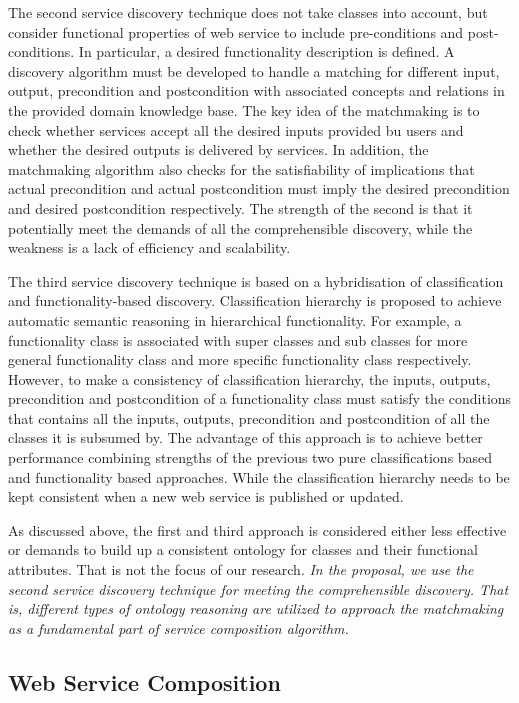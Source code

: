 The second service discovery technique  does not take classes into account, but consider functional properties of web service to include pre-conditions and post-conditions. In particular, a desired functionality description is defined. A discovery algorithm must be developed to handle a matching for different input, output, precondition and postcondition with associated concepts and relations in the provided domain knowledge base. The key idea of the matchmaking is to check whether services accept all the desired inputs provided bu users and whether the desired outputs is delivered by services. In addition, the matchmaking algorithm also checks for the satisfiability of implications that actual precondition and actual postcondition must imply the desired precondition and desired postcondition respectively. The strength of the second is that it potentially meet the demands of all the comprehensible discovery, while the weakness is a lack of efficiency and scalability. 

The third service discovery technique is based on a hybridisation of classification and functionality-based discovery. Classification hierarchy is proposed to achieve automatic semantic reasoning in hierarchical functionality. For example, a functionality class is associated with super classes and sub classes for more general functionality class and more specific functionality class respectively. However, to make a consistency of classification hierarchy, the inputs, outputs, precondition and postcondition of a functionality class must satisfy the conditions that contains all the inputs, outputs, precondition and postcondition of all the classes it is subsumed by. The advantage of this approach is to achieve better performance combining strengths of the previous two pure classifications based and functionality based approaches. While the classification hierarchy needs to be kept consistent when a new web service is published or updated.​

As discussed above, the first and third approach is considered either less effective or demands to build up a consistent ontology for classes and their functional attributes. That is not the focus of our research.  \emph{In the proposal, we use the second service discovery technique for meeting the comprehensible discovery. That is, different types of ontology reasoning are utilized to approach the matchmaking as a fundamental part of service composition algorithm.}



\subsection{Web Service Composition}\label{servicecomposition}

